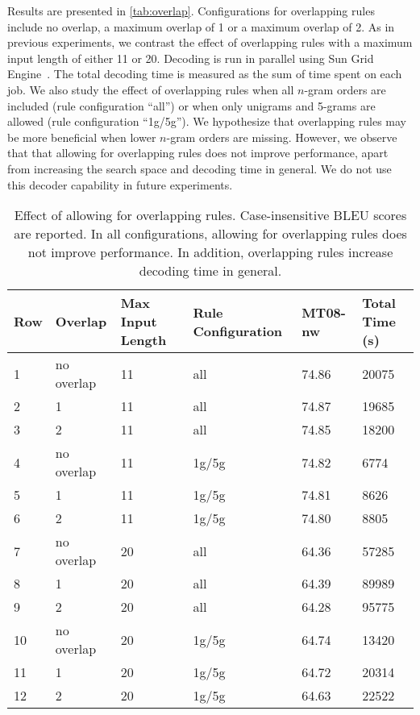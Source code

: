 Results are presented in
\autoref{tab:overlap}. Configurations for overlapping rules
include no overlap, a maximum overlap of 1 or a maximum overlap of 2.
As in previous experiments, we contrast the effect of overlapping
rules with a maximum input length of either 11 or 20.
Decoding is run in parallel using Sun Grid Engine~\citep{gentzsch:2001:CCG}.
The total decoding time is measured as the sum of time spent
on each job.
We also study the effect of overlapping rules when
all $n$-gram orders are included (rule configuration ``all'') or
when only unigrams and 5-grams are allowed (rule configuration ``1g/5g'').
We hypothesize that overlapping rules may be more beneficial
when lower $n$-gram orders are missing.
However, we observe that
that allowing for overlapping rules does not improve performance, apart from 
increasing the search space and decoding time in general.
We do not use this decoder capability in future experiments.

\begin{table}
  \begin{center}
  \begin{tabular}{l|l|l|l|l|l}
    Row & Overlap & Max Input Length &  Rule Configuration & MT08-nw & Total Time (s) \\
    \hline
    1 & no overlap & 11 & all & 74.86 & 20075 \\
    2 & 1          & 11 & all & 74.87 & 19685 \\
    3 & 2          & 11 & all & 74.85 & 18200 \\
    \hline
    4 & no overlap & 11 & 1g/5g & 74.82 & 6774 \\
    5 & 1          & 11 & 1g/5g & 74.81 & 8626 \\
    6 & 2          & 11 & 1g/5g & 74.80 & 8805 \\
    \hline
    7 & no overlap & 20 & all & 64.36 & 57285 \\
    8 & 1          & 20 & all & 64.39 & 89989 \\
    9 & 2          & 20 & all & 64.28 & 95775 \\
    \hline
    10 & no overlap & 20 & 1g/5g & 64.74 & 13420 \\
    11 & 1          & 20 & 1g/5g & 64.72 & 20314 \\
    12 & 2          & 20 & 1g/5g & 64.63 & 22522 \\
  \end{tabular}
  \caption{Effect of allowing for overlapping rules. Case-insensitive BLEU
    scores are reported. In all configurations, allowing for overlapping
    rules does not improve performance. In addition, overlapping
    rules increase decoding time in general.}
  \label{tab:overlap}
  \end{center}
\end{table}

